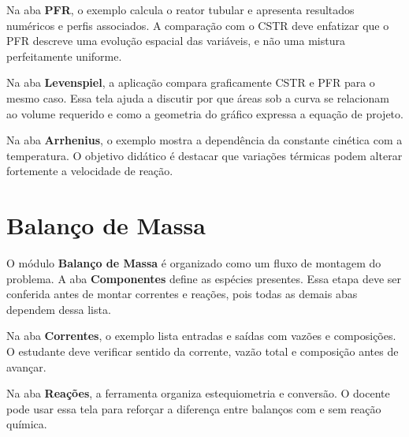 Na aba \textbf{PFR}, o exemplo calcula o reator tubular e apresenta resultados numéricos e perfis associados. A comparação com o CSTR deve enfatizar que o PFR descreve uma evolução espacial das variáveis, e não uma mistura perfeitamente uniforme.


Na aba \textbf{Levenspiel}, a aplicação compara graficamente CSTR e PFR para o mesmo caso. Essa tela ajuda a discutir por que áreas sob a curva se relacionam ao volume requerido e como a geometria do gráfico expressa a equação de projeto.


Na aba \textbf{Arrhenius}, o exemplo mostra a dependência da constante cinética com a temperatura. O objetivo didático é destacar que variações térmicas podem alterar fortemente a velocidade de reação.


\section{Balanço de Massa}

O módulo \textbf{Balanço de Massa} é organizado como um fluxo de montagem do problema. A aba \textbf{Componentes} define as espécies presentes. Essa etapa deve ser conferida antes de montar correntes e reações, pois todas as demais abas dependem dessa lista.


Na aba \textbf{Correntes}, o exemplo lista entradas e saídas com vazões e composições. O estudante deve verificar sentido da corrente, vazão total e composição antes de avançar.


Na aba \textbf{Reações}, a ferramenta organiza estequiometria e conversão. O docente pode usar essa tela para reforçar a diferença entre balanços com e sem reação química.

